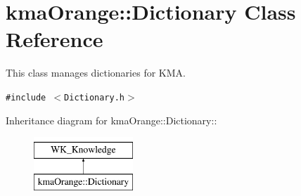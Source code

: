 \hypertarget{classkmaOrange_1_1Dictionary}{
\section{kmaOrange::Dictionary Class Reference}
\label{classkmaOrange_1_1Dictionary}
}
This class manages dictionaries for KMA.  


{\tt \#include $<$Dictionary.h$>$}

Inheritance diagram for kmaOrange::Dictionary::\begin{figure}[H]
\begin{center}
\leavevmode
\includegraphics[height=2cm]{classkmaOrange_1_1Dictionary}
\end{center}
\end{figure}
